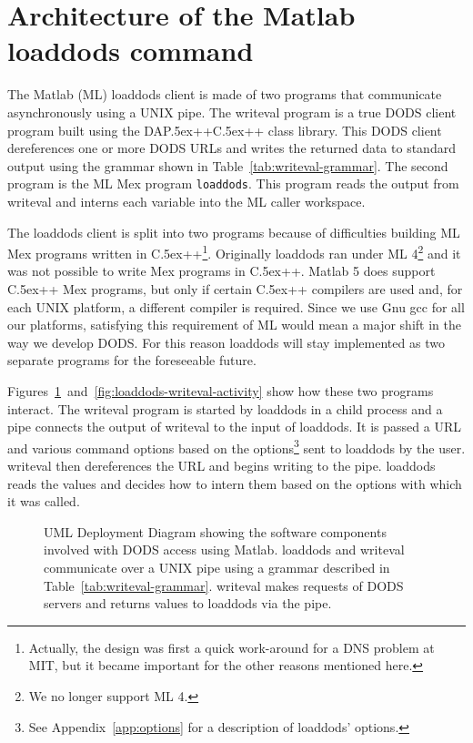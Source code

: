 \documentclass{article}
\newcommand{\Cpp}{\rm {\small C}\raise.5ex\hbox{\footnotesize ++}\xspace}
\newcommand{\dap}{\rm {\small DAP}\raise.5ex\hbox{\footnotesize ++}\xspace}
\begin{document}
\section{Architecture of the Matlab loaddods command}
\label{sec:arch}

The Matlab (ML) loaddods client is made of two programs that communicate
asynchronously using a UNIX pipe. The writeval program is a true DODS client
program built using the \dap \Cpp class library. This DODS client
dereferences one or more DODS URLs and writes the returned data to standard
output using the grammar shown in Table~\ref{tab:writeval-grammar}.
The second program is the ML Mex program \texttt{loaddods}. This program reads the
output from writeval and interns each variable into the ML caller
workspace.

The loaddods client is split into two programs because of difficulties
building ML Mex programs written in \Cpp\footnote{Actually, the design was
  first a quick work-around for a DNS problem at MIT, but it became important
  for the other reasons mentioned here.}. Originally loaddods ran under ML
4\footnote{We no longer support ML 4.} and it was not possible to write Mex
programs in \Cpp. Matlab 5 does support \Cpp Mex programs, but only if
certain \Cpp compilers are used and, for each UNIX platform, a different
compiler is required. Since we use Gnu gcc for all our platforms, satisfying
this requirement of ML would mean a major shift in the way we develop DODS.
For this reason loaddods will stay implemented as two separate programs for
the foreseeable future.

Figures~\ref{fig:loaddods-component}~and~\ref{fig:loaddods-writeval-activity}
show how these two programs interact. The writeval program is started by
loaddods in a child process and a pipe connects the output of writeval to the
input of loaddods. It is passed a URL and various command options based on
the options\footnote{See Appendix~\ref{app:options} for a description of
  loaddods' options.} sent to loaddods by the user. writeval then
dereferences the URL and begins writing to the pipe.  loaddods reads the
values and decides how to intern them based on the options with which it was
called.

\begin{figure}
\begin{center}
\caption{UML Deployment Diagram showing the software components involved with
  DODS access using Matlab. loaddods and writeval communicate over a UNIX
  pipe using a grammar described in Table~\ref{tab:writeval-grammar}.
  writeval makes requests of DODS servers and returns values to loaddods
  via the pipe.}
\label{fig:loaddods-component}
\end{center}
\end{figure}
\end{document}

